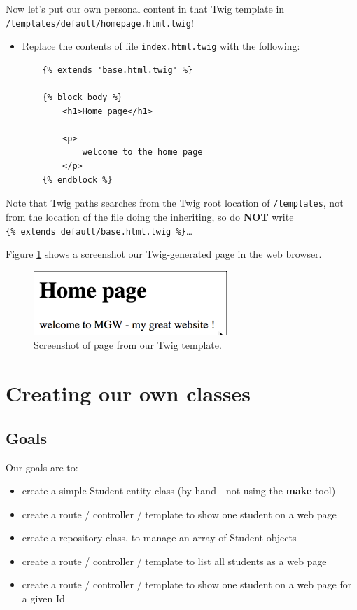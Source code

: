 \documentclass[a4paperpaper,openright]{book}
\providecommand{\tightlist}{%
  \setlength{\itemsep}{0pt}\setlength{\parskip}{0pt}}
\begin{document}
Now let's put our own personal content in that Twig template in
\texttt{/templates/default/homepage.html.twig}!

\begin{itemize}
\item
  Replace the contents of file \texttt{index.html.twig} with the
  following:

\begin{verbatim}
    {% extends 'base.html.twig' %}

    {% block body %}
        <h1>Home page</h1>

        <p>
            welcome to the home page
        </p>
    {% endblock %}
\end{verbatim}
\end{itemize}

Note that Twig paths searches from the Twig root location of
\texttt{/templates}, not from the location of the file doing the
inheriting, so do \textbf{NOT} write
\texttt{\{\%\ extends\ \textquotesingle{}default/base.html.twig\textquotesingle{}\ \%\}}\ldots{}

Figure \ref{twig_page} shows a screenshot our Twig-generated page in the
web browser.

\begin{figure}
\centering
\includegraphics{./tex2pdf.-65f13e14688ab55b/9fd62910f505d54b27171036acbf12dafc5b8057.png}
\caption{Screenshot of page from our Twig template. \label{twig_page}}
\end{figure}

\hypertarget{creating-our-own-classes}{%
\chapter{Creating our own classes}\label{creating-our-own-classes}}

\hypertarget{goals}{%
\section{Goals}\label{goals}}

Our goals are to:

\begin{itemize}
\tightlist
\item
  create a simple Student entity class (by hand - not using the
  \textbf{make} tool)
\item
  create a route / controller / template to show one student on a web
  page
\item
  create a repository class, to manage an array of Student objects
\item
  create a route / controller / template to list all students as a web
  page
\item
  create a route / controller / template to show one student on a web
  page for a given Id
\end{itemize}
\end{document}
